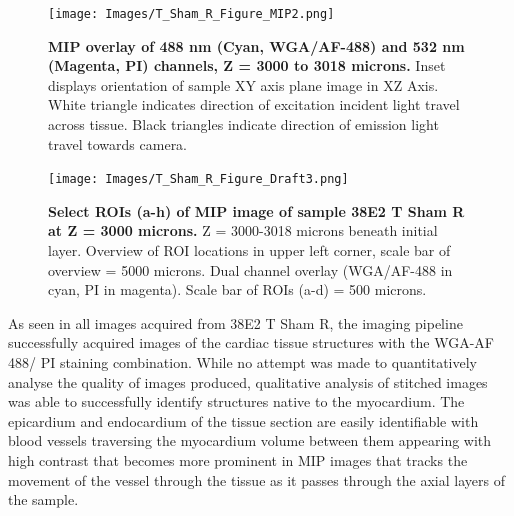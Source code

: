 \begin{figure}[H]
    \centering
        \texttt{[image: Images/T\_Sham\_R\_Figure\_MIP2.png]}
        \caption{\textbf{MIP overlay of 488 nm (Cyan, WGA/AF-488) and 532 nm (Magenta, PI) channels, Z = 3000 to 3018 microns.} Inset displays orientation of sample XY axis plane image in XZ Axis. White triangle indicates direction of excitation incident light travel across tissue. Black triangles indicate direction of emission light travel towards camera.}
        \label{fig:enter-label}
\end{figure}
        


\begin{figure}[H]
\texttt{[image: Images/T\_Sham\_R\_Figure\_Draft3.png]}
\caption{\textbf{Select ROIs (a-h) of MIP image of sample 38E2 T Sham R at Z = 3000 microns.} Z = 3000-3018 microns beneath initial layer. Overview of ROI locations in upper left corner, scale bar of overview = 5000 microns. Dual channel overlay (WGA/AF-488 in cyan, PI in magenta). Scale bar of ROIs (a-d) = 500 microns.}
\label{fig:enter-label}
\end{figure}

As seen in all images acquired from 38E2 T Sham R, the imaging pipeline successfully acquired images of the cardiac tissue structures with the WGA-AF 488/ PI staining combination. While no attempt was made to quantitatively analyse the quality of images produced, qualitative analysis of stitched images was able to successfully identify structures native to the myocardium. The epicardium and endocardium of the tissue section are easily identifiable with blood vessels traversing the myocardium volume between them appearing with high contrast that becomes more prominent in MIP images that tracks the movement of the vessel through the tissue as it passes through the axial layers of the sample.

